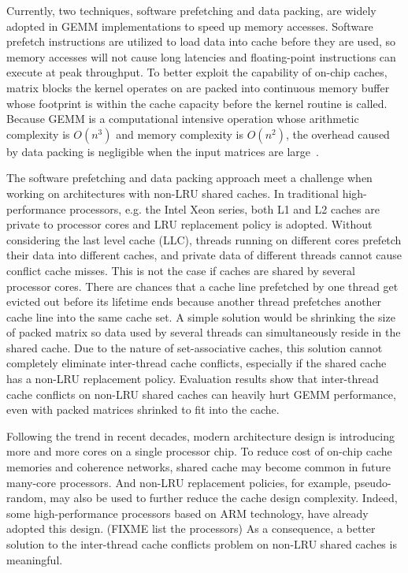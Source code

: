 Currently, two techniques, software prefetching and data packing,
are widely adopted in GEMM implementations to speed up memory accesses.
Software prefetch instructions are utilized
to load data into cache before they are used, so memory accesses will not
cause long latencies and floating-point instructions can execute at peak throughput.
To better exploit the capability of on-chip caches,
matrix blocks the kernel operates on are packed into continuous memory buffer
whose footprint is within the cache capacity before the kernel routine is called.
Because GEMM is a computational intensive operation whose
arithmetic complexity is $O(n^3)$ and memory complexity is $O(n^2)$,
the overhead caused by data packing is negligible when
the input matrices are large~\cite{gotogemm}.

The software prefetching and data packing approach meet a challenge
when working on architectures with non-LRU shared caches.
In traditional high-performance processors, e.g. the Intel Xeon series,
both L1 and L2 caches are private to processor cores
and LRU replacement policy is adopted.
Without considering the last level cache (LLC),
threads running on different cores prefetch their data into
different caches, and private data of different threads
cannot cause conflict cache misses.
This is not the case if caches are shared by several processor cores.
There are chances that a cache line prefetched by one thread
get evicted out before its lifetime ends because another thread prefetches
another cache line into the same cache set.
A simple solution would be shrinking the size of packed matrix
so data used by several threads can simultaneously reside in the shared cache.
Due to the nature of set-associative caches,
this solution cannot completely eliminate inter-thread cache conflicts,
especially if the shared cache has a non-LRU replacement policy.
Evaluation results show that inter-thread cache conflicts on non-LRU shared caches
can heavily hurt GEMM performance,
even with packed matrices shrinked to fit into the cache.

Following the trend in recent decades, modern architecture design
is introducing more and more cores on a single processor chip.
To reduce cost of on-chip cache memories and coherence networks,
shared cache may become common in future many-core processors.
And non-LRU replacement policies, for example, pseudo-random,
may also be used to further reduce the cache design complexity.
Indeed, some high-performance processors based on ARM technology,
have already adopted this design. (FIXME list the processors)
As a consequence, a better solution to the inter-thread cache conflicts problem
on non-LRU shared caches is meaningful.


